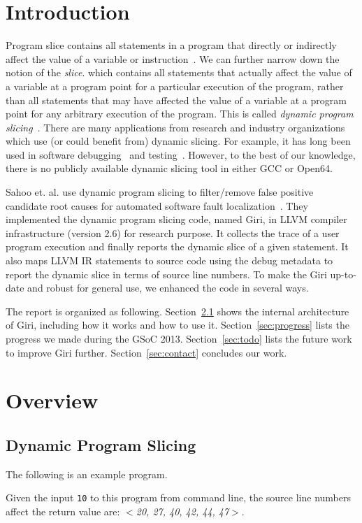 \documentclass[DIV=calc, paper=a4, fontsize=11pt, twocolumn]{scrartcl}
\begin{document}
\section{Introduction}
Program slice contains all statements in a program that directly or indirectly affect the value of a variable or instruction~\cite{weiser}.
We can further narrow down the notion of the \emph{slice}.
which contains all statements that actually affect the value of a variable at a program point for a particular execution of the program,
rather than all statements that may have affected the value of a variable at a program point for any arbitrary execution of the program.
This is called \emph{dynamic program slicing}~\cite{agrawal1990dynamic}.
There are many applications from research and industry organizations which use (or could benefit from) dynamic slicing.
For example, it has long been used in software debugging~\cite{1993debugging,1999efficient} and testing~\cite{1993incremental}.
However, to the best of our knowledge, there is no publicly available dynamic slicing tool in either GCC or Open64.

Sahoo et. al. use dynamic program slicing to filter/remove false positive candidate root causes for automated software fault localization~\cite{sahoo2013asplos}.
They implemented the dynamic program slicing code, named Giri, in LLVM compiler infrastructure (version 2.6) for research purpose.
It collects the trace of a user program execution and finally reports the dynamic slice of a given statement.
It also maps LLVM IR statements to source code using the debug metadata to report the dynamic slice in terms of source line numbers.
To make the Giri up-to-date and robust for general use, we enhanced the code in several ways.

The report is organized as following.
Section~\ref{sec:overview} shows the internal architecture of Giri, including how it works and how to use it.
Section~\ref{sec:progress} lists the progress we made during the GSoC 2013.
Section~\ref{sec:todo} lists the future work to improve Giri further.
Section~\ref{sec:contact} concludes our work.

\section{Overview}
\subsection{Dynamic Program Slicing}
\label{sec:overview}
The following is an example program.

Given the input \texttt{10} to this program from command line,
the source line numbers affect the return value are: $<$\emph{20, 27, 40, 42, 44, 47}$>$.
\end{document}
